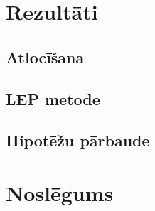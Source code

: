 \documentclass[titlepage, a4paper, LV]{mythesis}
\begin{document}
\chapter{Rezultāti}
\label{chap:results}


\section{Atlocīšana}


\clearpage
\section{LEP metode}


\clearpage
\section{Hipotēžu pārbaude}


\chapter{Noslēgums}


\clearpage
\printbibliography[heading=bibintoc]
\end{document}
